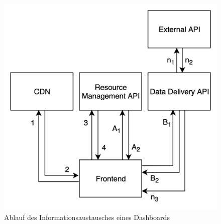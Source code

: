 \begin{figure}
    \begin{center}
    \includegraphics[scale=0.2]{img/abbildungen/InformationsaustauschDashboard}
    \end{center}
    \caption{Ablauf des Informationsaustausches eines Dashboards}
    \label{figure:informationsaustauschdashboard}
\end{figure}

